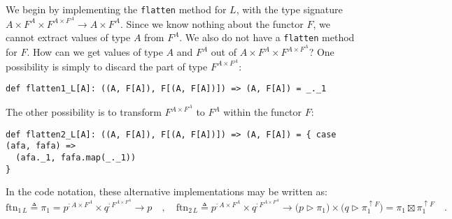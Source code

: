 We begin by implementing the \lstinline!flatten! method for $L$,
with the type signature $A\times F^{A}\times F^{A\times F^{A}}\rightarrow A\times F^{A}$.
Since we know nothing about the functor $F$, we cannot extract values
of type $A$ from $F^{A}$. We also do not have a \lstinline!flatten!
method for $F$. How can we get values of type $A$ and $F^{A}$ out
of $A\times F^{A}\times F^{A\times F^{A}}$? One possibility is simply
to discard the part of type $F^{A\times F^{A}}$:
\begin{lstlisting}
def flatten1_L[A]: ((A, F[A]), F[(A, F[A])]) => (A, F[A]) = _._1
\end{lstlisting}
The other possibility is to transform $F^{A\times F^{A}}$ to $F^{A}$
within the functor $F$:
\begin{lstlisting}
def flatten2_L[A]: ((A, F[A]), F[(A, F[A])]) => (A, F[A]) = { case (afa, fafa) =>
  (afa._1, fafa.map(_._1))
}
\end{lstlisting}
In the code notation, these alternative implementations may be written
as:
\[
\text{ftn}_{1\,L}\triangleq\pi_{1}=p^{:A\times F^{A}}\times q^{:F^{A\times F^{A}}}\rightarrow p\quad,\quad\text{ftn}_{2\,L}\triangleq p^{:A\times F^{A}}\times q^{:F^{A\times F^{A}}}\rightarrow\big(p\triangleright\pi_{1}\big)\times\big(q\triangleright\pi_{1}^{\uparrow F}\big)=\pi_{1}\boxtimes\pi_{1}^{\uparrow F}\quad.
\]

